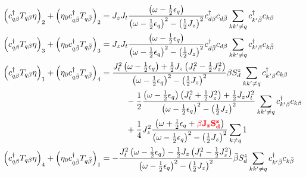 \documentclass[14pt]{extarticle}
\numberwithin{equation}{section}
\begin{document}
\begin{subequations} \label{eq:22} 
 \begin{align}
  \left( c^{\dag}_{q\beta}T_{q\beta}\eta \right)_2 + \left( \eta_0c^{\dag}_{q\bar{\beta}}T_{q\bar{\beta}} \right)_2  &= J_zJ_t \frac{\left( \omega -\frac{1}{2}\epsilon_q  \right)}{\left( \omega -\frac{1}{2}\epsilon_q  \right)^2 - \left( \frac{1}{2}J_z \right)^2}  c^{\dag}_{d\beta} c_{d\bar{\beta}} \sum\limits_{kk^{\prime}\ne q}  c^{\dag}_{k^{\prime}\bar{\beta}}c_{k\beta}  \label{eq:2} \\
  \left( c^{\dag}_{q\beta}T_{q\beta}\eta \right)_3 + \left( \eta_0c^{\dag}_{q\bar{\beta}}T_{q\bar{\beta}} \right)_3  &= J_zJ_t \frac{\left( \omega -\frac{1}{2}\epsilon_q  \right)}{\left( \omega -\frac{1}{2}\epsilon_q  \right)^2 - \left( \frac{1}{2}J_z \right)^2} c^{\dag}_{d\bar{\beta}} c_{d\beta} \sum\limits_{kk^{\prime}\ne q}  c^{\dag}_{k^{\prime}\beta}c_{k\bar{\beta}} \label{eq:3} \\
  \left( c^{\dag}_{q\beta}T_{q\beta}\eta \right)_1 + \left( \eta_0c^{\dag}_{q\bar{\beta}}T_{q\bar{\beta}} \right)_4 &= \frac{J_t^2 \left( \omega - \frac{1}{2}\epsilon_q \right)+ \frac{1}{2} J_z \left( J_t^2 - \frac{1}{2}J_z^2 \right)}{\left( \omega -\frac{1}{2}\epsilon_q  \right)^2 - \left( \frac{1}{2}J_z \right)^2}\beta S_d^z \sum\limits_{kk^{\prime}\ne q} c^{\dag}_{k^{\prime}\beta} c_{k\beta} \nonumber\\
&\hspace{30pt} - \frac{1}{2} \frac{\left( \omega -\frac{1}{2}\epsilon_q  \right) \left( J_t^2 + \frac{1}{2} J_z^2 \right) + \frac{1}{2} J_zJ_t^2}{\left( \omega -\frac{1}{2}\epsilon_q  \right)^2 - \left( \frac{1}{2}J_z \right)^2} \sum\limits_{kk^{\prime}\ne q} c^{\dag}_{k^{\prime}\beta} c_{k\beta}  \nonumber\\
&\hspace{30pt} + \frac{1}{4} J_z^2 \frac{\left( \omega + \frac{1}{2}\epsilon_q + {\color{red}{\mathbf{\beta J_z S_d^z}}} \right)}{\left( \omega -\frac{1}{2}\epsilon_q  \right)^2 - \left( \frac{1}{2}J_z \right)^2} \sum\limits_{k\ne q} 1 \label{eq:16} \\
  \left( c^{\dag}_{q\beta}T_{q\beta}\eta \right)_4 + \left( \eta_0c^{\dag}_{q\bar{\beta}}T_{q\bar{\beta}} \right)_1 &= -\frac{J_t^2 \left( \omega - \frac{1}{2}\epsilon_q \right) - \frac{1}{2} J_z \left( J_t^2 - \frac{1}{2}J_z^2 \right)}{\left( \omega -\frac{1}{2}\epsilon_q  \right)^2 - \left( \frac{1}{2}J_z \right)^2}\bar{\beta} S_d^z \sum\limits_{kk^{\prime}\ne q} c^{\dag}_{k^{\prime}\bar{\beta}} c_{k\bar{\beta}} \nonumber\\

\end{align}
\end{subequations}
\end{document}
